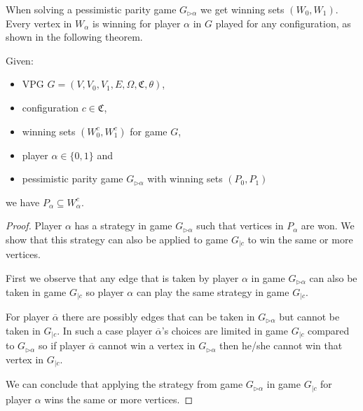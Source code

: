 When solving a pessimistic parity game $G_{\triangleright\alpha}$ we get winning sets $(W_0,W_1)$. Every vertex in $W_\alpha$ is winning for player $\alpha$ in $G$ played for any configuration, as shown in the following theorem.
\begin{theorem}
	\label{the_pess_is_winning_for_all_conf}
	Given:
	\begin{itemize}
		\item VPG $G = (V,V_0,V_1,E,\Omega,\mathfrak{C},\theta)$,
		\item configuration $c \in \mathfrak{C}$,
		\item winning sets $(W_0^c, W_1^c)$ for game $G$,
		\item player $\alpha \in \{0,1\}$ and
		\item pessimistic parity game $G_{\triangleright\alpha}$ with winning sets $(P_0,P_1)$
	\end{itemize}
	we have $P_\alpha \subseteq W_\alpha^c$.
	\begin{proof}
		Player $\alpha$ has a strategy in game $G_{\triangleright\alpha}$ such that vertices in $P_\alpha$ are won. We show that this strategy can also be applied to game $G_{|c}$ to win the same or more vertices.
		
		First we observe that any edge that is taken by player $\alpha$ in game $G_{\triangleright\alpha}$ can also be taken in game $G_{|c}$ so player $\alpha$ can play the same strategy in game $G_{|c}$.
		
		For player $\overline{\alpha}$ there are possibly edges that can be taken in $G_{\triangleright\alpha}$ but cannot be taken in $G_{|c}$. In such a case player $\overline{\alpha}$'s choices are limited in game $G_{|c}$ compared to $G_{\triangleright\alpha}$ so if player $\overline{\alpha}$ cannot win a vertex in $G_{\triangleright\alpha}$ then he/she cannot win that vertex in $G_{|c}$.
		
		We can conclude that applying the strategy from game $G_{\triangleright\alpha}$ in game $G_{|c}$ for player $\alpha$ wins the same or more vertices.
	\end{proof}
\end{theorem}

